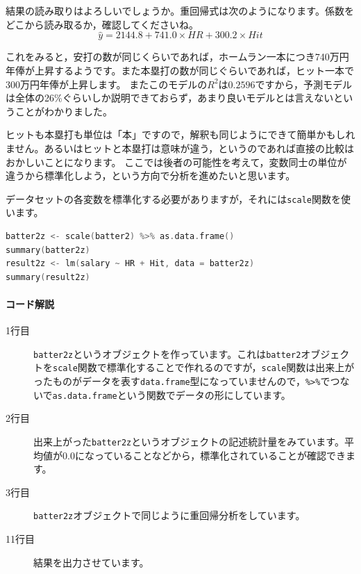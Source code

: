 \documentclass{ltjbook}
\begin{document}
結果の読み取りはよろしいでしょうか。重回帰式は次のようになります。係数をどこから読み取るか，確認してくださいね。
\[ \hat{y} = 2144.8 + 741.0 \times HR + 300.2 \times Hit \]

これをみると，安打の数が同じくらいであれば，ホームラン一本につき740万円年俸が上昇するようです。また本塁打の数が同じぐらいであれば，ヒット一本で300万円年俸が上昇します。
またこのモデルの$R^2$は$0.2596$ですから，予測モデルは全体の26\%ぐらいしか説明できておらず，あまり良いモデルとは言えないということがわかりました。

ヒットも本塁打も単位は「本」ですので，解釈も同じようにできて簡単かもしれません。あるいはヒットと本塁打は意味が違う，というのであれば直接の比較はおかしいことになります。
ここでは後者の可能性を考えて，変数同士の単位が違うから標準化しよう，という方向で分析を進めたいと思います。

データセットの各変数を標準化する必要がありますが，それには\texttt{scale}関数を使います。

\begin{lstlisting}[language=c++,label={code::11_07},caption={標準化したデータで重回帰分析を実行}]
batter2z <- scale(batter2) %>% as.data.frame()
summary(batter2z)
result2z <- lm(salary ~ HR + Hit, data = batter2z)
summary(result2z)
\end{lstlisting}


\paragraph{コード解説}
\begin{description}
    \item[1行目]\texttt{batter2z}というオブジェクトを作っています。これは\texttt{batter2}オブジェクトを\verb|scale|関数で標準化することで作れるのですが，\verb|scale|関数は出来上がったものがデータを表す\texttt{data.frame}型になっていませんので，\verb|%>%|でつないで\verb|as.data.frame|という関数でデータの形にしています。
    \item[2行目] 出来上がった\texttt{batter2z}というオブジェクトの記述統計量をみています。平均値が0.0になっていることなどから，標準化されていることが確認できます。
    \item[3行目]  \texttt{batter2z}オブジェクトで同じように重回帰分析をしています。
    \item[11行目] 結果を出力させています。
\end{description}
\end{document}
